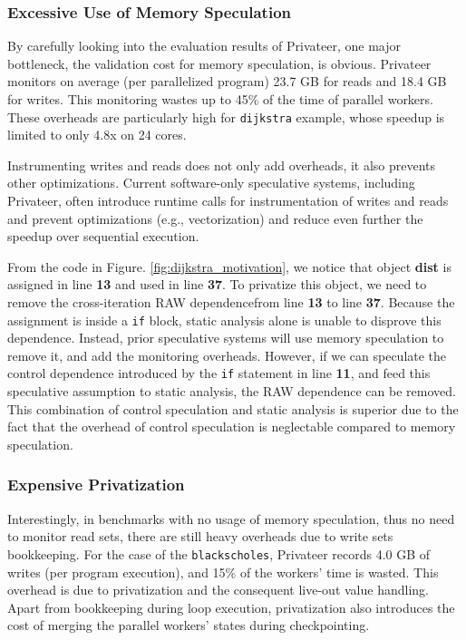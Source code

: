 \subsubsection{Excessive Use of Memory Speculation}

By carefully looking into the evaluation results of Privateer, one major
bottleneck, the validation cost for memory speculation, is obvious.
%
Privateer monitors on average (per parallelized program) 23.7 GB for reads
and 18.4 GB for writes. This monitoring wastes up to 45\% of the time of
parallel workers. These overheads are particularly high for
\texttt{dijkstra} example, whose speedup is limited to only 4.8x on 24
cores.

Instrumenting writes and reads does not only add overheads, it also
prevents other optimizations. Current software-only speculative systems,
including Privateer, often introduce runtime calls for instrumentation of
writes and reads and prevent optimizations (e.g., vectorization) and reduce
even further the speedup over sequential execution.

From the code in Figure. \ref{fig:dijkstra_motivation}, we notice that
object \textbf{dist} is assigned in line \textbf{13} and used in line
\textbf{37}. To privatize this object, we need to remove the
cross-iteration RAW dependencefrom line \textbf{13} to line \textbf{37}.
Because the assignment is inside a \texttt{if} block, static analysis alone
is unable to disprove this dependence. Instead, prior speculative systems
will use memory speculation to remove it, and add the monitoring overheads.
However, if we can speculate the control dependence introduced by the
\texttt{if} statement in line \textbf{11}, and feed this speculative
assumption to static analysis, the RAW dependence can be removed. This
combination of control speculation and static analysis is superior due to
the fact that the overhead of control speculation is neglectable compared
to memory speculation.

\subsubsection{Expensive Privatization}

Interestingly, in benchmarks with no usage of memory speculation, thus no
need to monitor read sets, there are still heavy overheads due to write
sets bookkeeping. For the case of the \texttt{blackscholes}, Privateer
records 4.0 GB of writes (per program execution), and 15\% of the workers'
time is wasted. This overhead is due to privatization and the consequent
live-out value handling.
%
Apart from bookkeeping during loop execution, privatization also introduces
the cost of merging the parallel workers' states during checkpointing.

